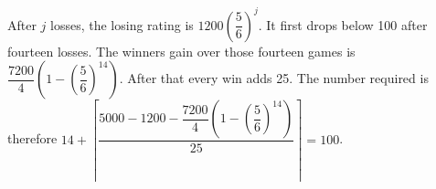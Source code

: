After $j$ losses, the losing rating is $1200(\dfrac{5}{6})^j$. It first drops below 100 after fourteen losses. The winner\textquotesingle s gain over those fourteen games is $\dfrac{7200}{4}(1-(\dfrac{5}{6})^{14})$. After that every win adds 25. The number required is therefore $14+\left\lceil\dfrac{5000-1200-\dfrac{7200}{4}(1-(\dfrac{5}{6})^{14})}{25}\right\rceil=\boxed{100}$.
